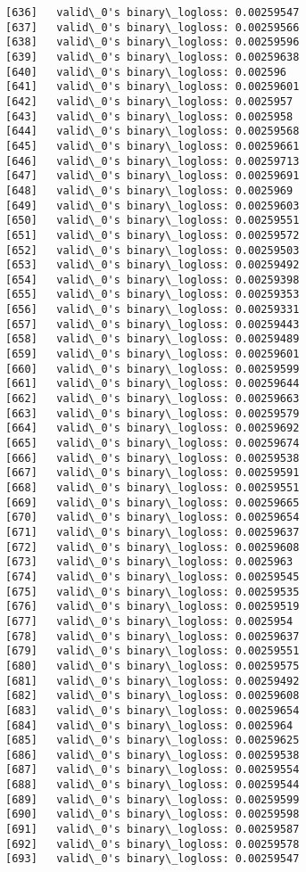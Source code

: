 \documentclass[11pt]{article}
\begin{document}
\begin{Verbatim}[commandchars=\\\{\}]
[636]	valid\_0's binary\_logloss: 0.00259547
[637]	valid\_0's binary\_logloss: 0.00259566
[638]	valid\_0's binary\_logloss: 0.00259596
[639]	valid\_0's binary\_logloss: 0.00259638
[640]	valid\_0's binary\_logloss: 0.002596
[641]	valid\_0's binary\_logloss: 0.00259601
[642]	valid\_0's binary\_logloss: 0.0025957
[643]	valid\_0's binary\_logloss: 0.0025958
[644]	valid\_0's binary\_logloss: 0.00259568
[645]	valid\_0's binary\_logloss: 0.00259661
[646]	valid\_0's binary\_logloss: 0.00259713
[647]	valid\_0's binary\_logloss: 0.00259691
[648]	valid\_0's binary\_logloss: 0.0025969
[649]	valid\_0's binary\_logloss: 0.00259603
[650]	valid\_0's binary\_logloss: 0.00259551
[651]	valid\_0's binary\_logloss: 0.00259572
[652]	valid\_0's binary\_logloss: 0.00259503
[653]	valid\_0's binary\_logloss: 0.00259492
[654]	valid\_0's binary\_logloss: 0.00259398
[655]	valid\_0's binary\_logloss: 0.00259353
[656]	valid\_0's binary\_logloss: 0.00259331
[657]	valid\_0's binary\_logloss: 0.00259443
[658]	valid\_0's binary\_logloss: 0.00259489
[659]	valid\_0's binary\_logloss: 0.00259601
[660]	valid\_0's binary\_logloss: 0.00259599
[661]	valid\_0's binary\_logloss: 0.00259644
[662]	valid\_0's binary\_logloss: 0.00259663
[663]	valid\_0's binary\_logloss: 0.00259579
[664]	valid\_0's binary\_logloss: 0.00259692
[665]	valid\_0's binary\_logloss: 0.00259674
[666]	valid\_0's binary\_logloss: 0.00259538
[667]	valid\_0's binary\_logloss: 0.00259591
[668]	valid\_0's binary\_logloss: 0.00259551
[669]	valid\_0's binary\_logloss: 0.00259665
[670]	valid\_0's binary\_logloss: 0.00259654
[671]	valid\_0's binary\_logloss: 0.00259637
[672]	valid\_0's binary\_logloss: 0.00259608
[673]	valid\_0's binary\_logloss: 0.0025963
[674]	valid\_0's binary\_logloss: 0.00259545
[675]	valid\_0's binary\_logloss: 0.00259535
[676]	valid\_0's binary\_logloss: 0.00259519
[677]	valid\_0's binary\_logloss: 0.0025954
[678]	valid\_0's binary\_logloss: 0.00259637
[679]	valid\_0's binary\_logloss: 0.00259551
[680]	valid\_0's binary\_logloss: 0.00259575
[681]	valid\_0's binary\_logloss: 0.00259492
[682]	valid\_0's binary\_logloss: 0.00259608
[683]	valid\_0's binary\_logloss: 0.00259654
[684]	valid\_0's binary\_logloss: 0.0025964
[685]	valid\_0's binary\_logloss: 0.00259625
[686]	valid\_0's binary\_logloss: 0.00259538
[687]	valid\_0's binary\_logloss: 0.00259554
[688]	valid\_0's binary\_logloss: 0.00259544
[689]	valid\_0's binary\_logloss: 0.00259599
[690]	valid\_0's binary\_logloss: 0.00259598
[691]	valid\_0's binary\_logloss: 0.00259587
[692]	valid\_0's binary\_logloss: 0.00259578
[693]	valid\_0's binary\_logloss: 0.00259547

\end{Verbatim}
\end{document}
